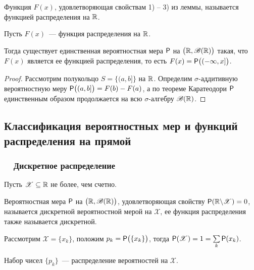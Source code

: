 \begin{definition}
	Функция $F(x)$, удовлетворяющая свойствам 1) -- 3) из леммы, называется функцией распределения на $\R$.
\end{definition}
\begin{theorem}
	Пусть $F(x)$~--- функция распределения на $\R$.
	
	Тогда существует единственная вероятностная мера $\P$ на $\big(\R, \B(\R) \big)$ такая, что $F(x)$ является ее функцией распределения, то есть $F(x) = \P \big( ( -\infty, x] \big)$.
	\begin{proof}
		Рассмотрим полукольцо $ S = \big\{ (a, b] \big\}$ на $\R$. Определим $\sigma$-аддитивную вероятностную меру $\P \big( (a, b] \big) = F(b) - F(a)$, а по теореме Каратеодори $\P$ единственным образом продолжается на всю $\sigma$-алгебру $\B(\R)$.
	\end{proof}
\end{theorem}
\subsection{Классификация вероятностных мер и функций распределения на прямой}
\subsubsection*{~~Дискретное распределение}
Пусть $\mathscr{X} \subseteq \R$ не более, чем счетно.
\begin{definition}
	Вероятностная мера $\P$ на $\big( \R, \B(\R) \big)$, удовлетворяющая свойству $\P(\R \backslash \mathscr{X}) = 0$, называется дискретной вероятностной мерой на $\mathscr{X}$, ее функция распределения также называется дискретной.
\end{definition}

Рассмотрим $\mathscr{X} = \{ x_k \}$, положим $p_k = \P \big( \{x_k \} \big)$, тогда $\P( \mathscr{X} ) = 1 = \sum\limits_{k} \P ( x_k )$.

\begin{definition}
	Набор чисел $\{ p_k \}$~--- распределение вероятностей на $\mathscr{X}$.
\end{definition}

